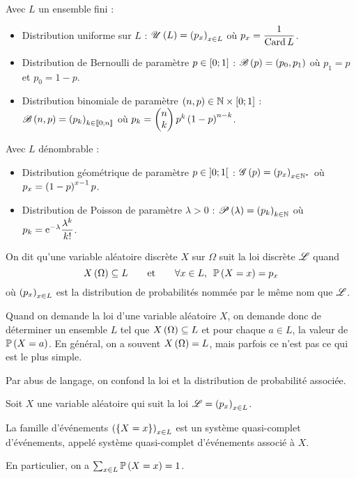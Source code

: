 \begin{ex}
Avec \(L\) un ensemble fini :

\begin{itemize}
    \item Distribution uniforme sur \(L\) : \(\loiuniforme{L}=\paren{p_x}_{x\in L}\) où \(p_x=\dfrac{1}{\Card L}\). \\
    \item Distribution de Bernoulli de paramètre \(p\in\intervii{0}{1}\) : \(\loibernoulli{p}=\paren{p_0,p_1}\) où \(p_1=p\) et \(p_0=1-p\). \\
    \item Distribution binomiale de paramètre \(\paren{n,p}\in\N\times\intervii{0}{1}\) : \(\loibinomiale{n}{p}=\paren{p_k}_{k\in\interventierii{0}{n}}\) où \(p_k=\binom{k}{n}p^k\paren{1-p}^{n-k}\).
\end{itemize}

Avec \(L\) dénombrable :

\begin{itemize}
    \item Distribution géométrique de paramètre \(p\in\intervee{0}{1}\) : \(\loigeometrique{p}=\paren{p_x}_{x\in\Ns}\) où \(p_x=\paren{1-p}^{x-1}p\). \\
    \item Distribution de Poisson de paramètre \(\lambda>0\) : \(\loipoisson{\lambda}=\paren{p_k}_{k\in\N}\) où \(p_k=\e{-\lambda}\dfrac{\lambda^k}{k!}\).
\end{itemize}
\end{ex}

\begin{defi}
On dit qu'une variable aléatoire discrète \(X\) sur \(\Omega\) suit la loi discrète \(\fami{L}\) quand \[X\paren{\Omega}\subset L\qquad\text{et}\qquad\quantifs{\forall x\in L}\proba{X=x}=p_x\] où \(\paren{p_x}_{x\in L}\) est la distribution de probabilités nommée par le même nom que \(\fami{L}\).
\end{defi}

Quand on demande la loi d'une variable aléatoire \(X\), on demande donc de déterminer un ensemble \(L\) tel que \(X\paren{\Omega}\subset L\) et pour chaque \(a\in L\), la valeur de \(\proba{X=a}\). En général, on a souvent \(X\paren{\Omega}=L\), mais parfois ce n'est pas ce qui est le plus simple.

Par abus de langage, on confond la loi et la distribution de probabilité associée.

\begin{prop}
Soit \(X\) une variable aléatoire qui suit la loi \(\fami{L}=\paren{p_x}_{x\in L}\).

La famille d'événements \(\paren{\accol{X=x}}_{x\in L}\) est un système quasi-complet d'événements, appelé système quasi-complet d'événements associé à \(X\).

En particulier, on a \(\sum_{x\in L}\proba{X=x}=1\).
\end{prop}

